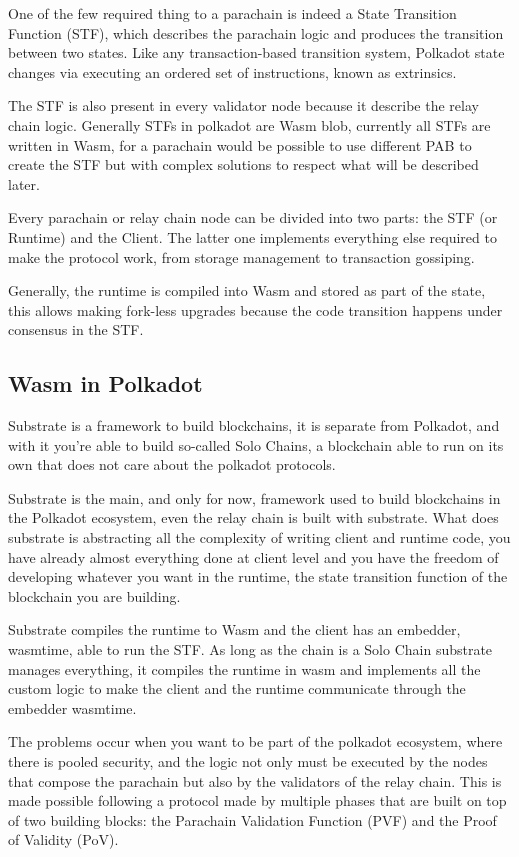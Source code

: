 \documentclass[../main.tex]{subfiles}
\begin{document}
One of the few required thing to a parachain is indeed a State Transition Function (STF), which describes the parachain logic and produces the transition between two states. Like any transaction-based transition system, Polkadot state changes via  executing an ordered set of instructions, known as extrinsics.~\cite{burdges2020overview}

The STF is also present in every validator node because it describe the relay chain logic. Generally STFs in polkadot are Wasm blob, currently all STFs are written in Wasm, for a parachain would be possible to use different PAB to create the STF but with complex solutions to respect what will be described later.

Every parachain or relay chain node can be divided into two parts: the STF (or Runtime) and the Client. The latter one implements everything else required to make the protocol work, from storage management to transaction gossiping.

Generally, the runtime is compiled into Wasm and stored as part of the state, this allows making fork-less upgrades because the code transition happens under consensus in the STF.

\subsection{Wasm in Polkadot}

Substrate is a framework to build blockchains, it is separate from Polkadot, and with it you're able to build so-called Solo Chains, a blockchain able to run on its own that does not care about the polkadot protocols.

Substrate is the main, and only for now, framework used to build blockchains in the Polkadot ecosystem, even the relay chain is built with substrate. What does substrate is abstracting all the complexity of writing client and runtime code, you have already almost everything done at client level and you have the freedom of developing whatever you want in the runtime, the state transition function of the blockchain you are building.

Substrate compiles the runtime to Wasm and the client has an embedder, wasmtime, able to run the STF. As long as the chain is a Solo Chain substrate manages everything, it compiles the runtime in wasm and implements all the custom logic to make the client and the runtime communicate through the embedder wasmtime.

The problems occur when you want to be part of the polkadot ecosystem, where there is pooled security, and the logic not only must be executed by the nodes that compose the parachain but also by the validators of the relay chain. This is made possible following a protocol made by multiple phases that are built on top of two building blocks: the Parachain Validation Function (PVF) and the Proof of Validity (PoV).~\cite{parachain-protocol}
\end{document}
